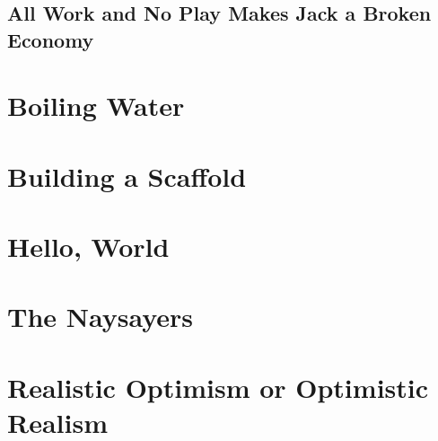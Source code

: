 \documentclass[12pt]{memoir}
\begin{document}
		\section{All Work and No Play Makes Jack a Broken Economy}
		
	\chapter{Boiling Water}
	
	\chapter{Building a Scaffold}
	
	\chapter{Hello, World}
	
	\chapter{The Naysayers}
	
	\chapter{Realistic Optimism or Optimistic Realism}
	
	
	
	
\end{document}
